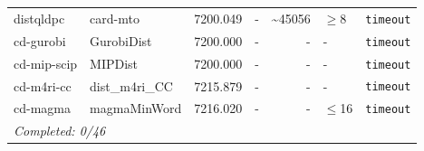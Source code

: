 \begin{longtable}{llrrrl p{}}
distqldpc & card-mto & 7200.049 & - & \textasciitilde{}45056 & $\geq$8 & \texttt{timeout} \\
cd-gurobi & GurobiDist & 7200.000 & - & - & - & \texttt{timeout} \\
cd-mip-scip & MIPDist & 7200.000 & - & - & - & \texttt{timeout} \\
cd-m4ri-cc & dist\_m4ri\_CC & 7215.879 & - & - & - & \texttt{timeout} \\
cd-magma & magmaMinWord & 7216.020 & - & - & $\leq$16 & \texttt{timeout} \\
\midrule
\multicolumn{7}{l}{\textit{Completed: 0/46}} \\
\end{longtable}
